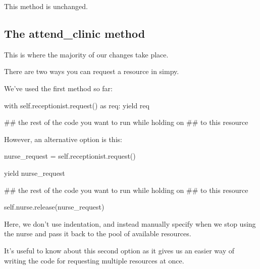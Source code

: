 \documentclass[
  letterpaper,
  DIV=11,
  numbers=noendperiod]{scrreprt}
\newenvironment{Shaded}{}{}
\newcommand{\CommentTok}[1]{\textcolor[rgb]{0.42,0.45,0.49}{#1}}
\newcommand{\ControlFlowTok}[1]{\textcolor[rgb]{0.84,0.23,0.29}{#1}}
\newcommand{\ImportTok}[1]{\textcolor[rgb]{0.01,0.18,0.38}{#1}}
\newcommand{\NormalTok}[1]{\textcolor[rgb]{0.14,0.16,0.18}{#1}}
\newcommand{\OperatorTok}[1]{\textcolor[rgb]{0.14,0.16,0.18}{#1}}
\newcommand{\VariableTok}[1]{\textcolor[rgb]{0.89,0.38,0.04}{#1}}
\begin{document}
This method is unchanged.

\subsection{The attend\_clinic method}\label{the-attend_clinic-method-6}

This is where the majority of our changes take place.

\begin{tcolorbox}[enhanced jigsaw, colframe=quarto-callout-tip-color-frame, bottomtitle=1mm, breakable, rightrule=.15mm, coltitle=black, colbacktitle=quarto-callout-tip-color!10!white, opacityback=0, leftrule=.75mm, arc=.35mm, toptitle=1mm, title=\textcolor{quarto-callout-tip-color}{\faLightbulb}\hspace{0.5em}{Tip}, titlerule=0mm, colback=white, toprule=.15mm, bottomrule=.15mm, left=2mm, opacitybacktitle=0.6]

There are two ways you can request a resource in simpy.

We've used the first method so far:

\begin{Shaded}
\begin{Highlighting}[]
\ControlFlowTok{with} \VariableTok{self}\NormalTok{.receptionist.request() }\ImportTok{as}\NormalTok{ req:}
    \ControlFlowTok{yield}\NormalTok{ req}

    \CommentTok{\#\# the rest of the code you want to run while holding on}
    \CommentTok{\#\# to this resource}
\end{Highlighting}
\end{Shaded}

However, an alternative option is this:

\begin{Shaded}
\begin{Highlighting}[]
\NormalTok{nurse\_request }\OperatorTok{=} \VariableTok{self}\NormalTok{.receptionist.request()}

\ControlFlowTok{yield}\NormalTok{ nurse\_request}

\CommentTok{\#\# the rest of the code you want to run while holding on}
\CommentTok{\#\# to this resource}

\VariableTok{self}\NormalTok{.nurse.release(nurse\_request)}
\end{Highlighting}
\end{Shaded}

Here, we don't use indentation, and instead manually specify when we
stop using the nurse and pass it back to the pool of available
resources.

It's useful to know about this second option as it gives us an easier
way of writing the code for requesting multiple resources at once.

\end{tcolorbox}
\end{document}
